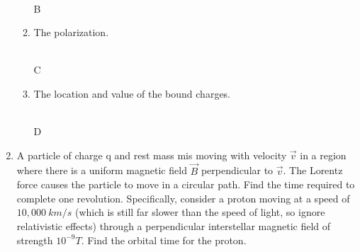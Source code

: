 \documentclass[fleqn]{article}
\begin{document}
\begin{enumerate}
\begin{enumerate}
        \textcolor{hwColor}{
          \\
          B
        }

      \item The polarization.

        \textcolor{hwColor}{
          \\
          C
        }

      \item The location and value of the bound charges.

        \textcolor{hwColor}{
          \\
          D
        }
  
    \end{enumerate}

    \item A particle of charge q and rest mass mis moving with velocity $\overrightarrow{v}$ in a region where there 
    is a uniform magnetic field $\overrightarrow{B}$ perpendicular to $\overrightarrow{v}$. The Lorentz force causes 
    the particle to move in a circular path. Find the time required to complete one revolution. Specifically, consider
    a proton moving at a speed of $10,000 ~ km/s$ (which is still far slower than the speed of light, so ignore relativistic 
    effects) through a perpendicular interstellar magnetic field of strength $10^{-9} T$. Find the orbital time for the proton.


\end{enumerate}
\end{document}
